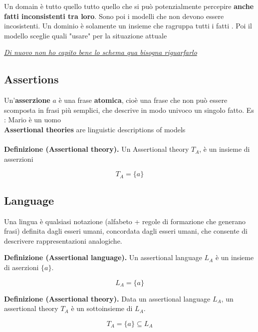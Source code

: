 \documentclass [12pt, letterpaper]{article}
\begin{document}
Un domain è tutto quello tutto quello che si può potenzialmente percepire \textbf{anche fatti inconsistenti tra loro}. Sono poi i modelli che non devono essere incosistenti. Un dominio è solamente un insieme che ragruppa tutti i fatti . Poi il modello sceglie quali "usare" per la situazione attuale 


\underline{\textit{Di nuovo non ho capito bene lo schema qua bisogna riguarfarlo }}

\subsection{Assertions}
Un'\textbf{asserzione} $a$ è una frase \textbf{atomica}, cioè una frase che non può essere scomposta in frasi più semplici, che descrive in modo univoco un singolo fatto. Es : Mario è un uomo	
\\

\textbf{Assertional theories} are linguistic descriptions of models\\ \\
	\textbf{Definizione (Assertional theory).} Un Assertional theory $T_{A}$, è un insieme di asserzioni  

\[
T_{A} = \{a\} 
\]

\subsection{Language}
	Una lingua è qualsiasi notazione
	(alfabeto + regole di formazione che generano frasi) definita
	dagli esseri umani, concordata dagli esseri umani, che consente di
	descrivere rappresentazioni analogiche.
	
	
	\textbf{Definizione  (Assertional language).} Un assertional language $L_A$ è un insieme di aserzioni $\{a\}$.
	
	\[
	L_A = \{a\}
	\]
	
	\vspace{1cm}
	
	\textbf{Definizione (Assertional theory).} Data un assertional language $L_A$, un assertional theory $T_A$ è un sottoinsieme di  $L_A$.
	
	\[
	T_A = \{a\} \subseteq L_A
	\]
\end{document}
